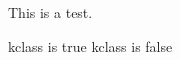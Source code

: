 \documentclass[a4paper,12pt]{article}
\begin{document}


This is a test.

\iftoggle{paper}{
	paper is true
}{
	paper is false
}

\ifkclass
  kclass is true
\else
  kclass is false
\fi
\end{document}
